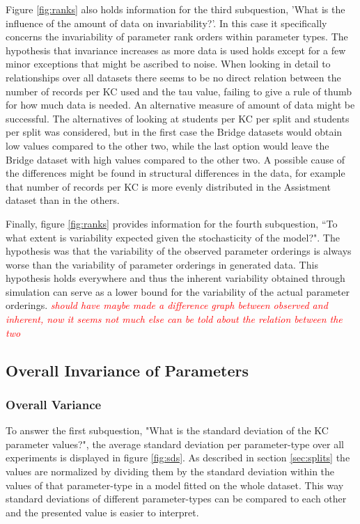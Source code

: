 \documentclass{scrartcl}
\newcommand\todo[1]{\textit{\textcolor{red}{#1}}}
\begin{document}
Figure \ref{fig:ranks} also holds information for the third subquestion, 'What is the influence of the amount of data on invariability?'. In this case it specifically concerns the invariability of parameter rank orders within parameter types. The hypothesis that invariance increases as more data is used holds except for a few minor exceptions that might be ascribed to noise. When looking in detail to relationships over all datasets there seems to be no direct relation between the number of records per KC used and the tau value, failing to give a rule of thumb for how much data is needed. An alternative measure of amount of data might be successful. The alternatives of looking at students per KC per split and students per split was considered, but in the first case the Bridge datasets would obtain low values compared to the other two, while the last option would leave the Bridge dataset with high values compared to the other two. A possible cause of the differences might be found in structural differences in the data, for example that number of records per KC is more evenly distributed in the Assistment dataset than in the others.  

Finally, figure \ref{fig:ranks} provides information for the fourth subquestion, ``To what extent is variability expected given the stochasticity of the model?". The hypothesis was that the variability of the observed parameter orderings is always worse than the variability of parameter orderings in generated data. This hypothesis holds everywhere and thus the inherent variability obtained through simulation can serve as a lower bound for the variability of the actual parameter orderings. 
\todo{should have maybe made a difference graph between observed and inherent, now it seems not much else can be told about the relation between the two}

\subsection{Overall Invariance of Parameters}
\label{sec:varresults}
\subsubsection{Overall Variance}
To answer the first subquestion, "What is the standard deviation of the KC parameter values?", the average standard deviation per parameter-type over all experiments is displayed in figure \ref{fig:sds}. As described in section \ref{sec:splits} the values are normalized by dividing them by the standard deviation within the values of that parameter-type in a model fitted on the whole dataset. This way standard deviations of different parameter-types can be compared to each other and the presented value is easier to interpret. 
\end{document}
